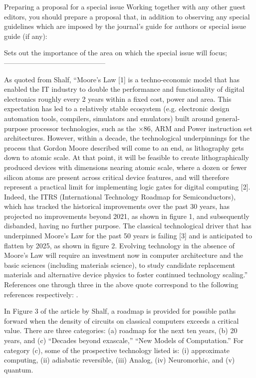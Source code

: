 \documentclass[]{article}
\begin{document}
Preparing a proposal for a special issue
Working together with any other guest editors, you should prepare a proposal that, in addition to observing any special guidelines which are imposed by the journal's guide for authors or special issue guide (if any):

Sets out the importance of the area on which the special issue will focus;
--------------------------------------------

As quoted from Shalf\cite{shalf2020future},
``Moore’s Law [1] is a techno-economic model that has enabled the IT industry to double the performance and functionality of digital electronics roughly every 2 years within a fixed cost, power and area. This expectation has led to a relatively stable ecosystem (e.g. electronic design automation tools, compilers, simulators and emulators) built around general-purpose processor technologies, such as the ×86, ARM and Power instruction set architectures. However, within a decade, the technological underpinnings for the process that Gordon Moore described will come to an end, as lithography gets down to atomic scale. At that point, it will be feasible to create lithographically produced devices with dimensions nearing atomic scale, where a dozen or fewer silicon atoms are present across critical device features, and will therefore represent a practical limit for implementing logic gates for digital computing [2]. Indeed, the ITRS (International Technology Roadmap for Semiconductors), which has tracked the historical improvements over the past 30 years, has projected no improvements beyond 2021, as shown in figure 1, and subsequently disbanded, having no further purpose. The classical technological driver that has underpinned Moore’s Law for the past 50 years is failing [3] and is anticipated to flatten by 2025, as shown in figure 2. Evolving technology in the absence of Moore’s Law will require an investment now in computer architecture and the basic sciences (including materials science), to study candidate replacement materials and alternative device physics to foster continued technology scaling.'' References one through three in the above quote 
correspond to the following references respectively: 
\cite{moore2021cramming}\cite{mack2015multiple}\cite{markov2014limits}.

In Figure 3 of the article by Shalf\cite{shalf2020future}, a roadmap is provided for possible paths forward when the density of circuits on classical computers exceeds a critical value.  There are three categories: (a) roadmap for the next ten years, (b) 20 years, and (c) ``Decades beyond exascale,'' ``New Models of Computation.'' For category (c), some of the prospective technology listed is:
(i) approximate computing, (ii) adiabatic reversible, (iii) Analog, (iv) Neuromorhic, and (v) quantum.
\end{document}

